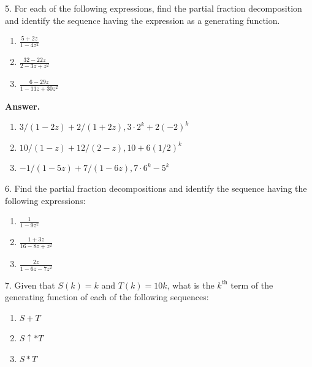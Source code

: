 \documentclass[10pt,]{book}
\theoremstyle{plain}
\theoremstyle{definition}
\theoremstyle{definition}
\theoremstyle{definition}
\theoremstyle{definition}
\numberwithin{equation}{section}
\begin{document}
\begin{exercisegroup}
\item[5.]\hypertarget{exercise-41}{}For each of the following expressions, find the partial fraction decomposition and identify the sequence having the expression as a generating
function.%
\par
\leavevmode%
\begin{enumerate}[label=\alph*]
\item\hypertarget{li-184}{} \(\frac{5+2z}{1-4z^2}\)%
\item\hypertarget{li-185}{} \(\frac{32-22z}{2-3z+z^2}\)%
\item\hypertarget{li-186}{} \(\frac{6-29z}{1-11z+ 30z^2}\)%
\end{enumerate}
%
\par\smallskip
\par\smallskip
\noindent\textbf{Answer.}\hypertarget{answer-21}{}\quad
\leavevmode%
\begin{enumerate}[label=\alph*]
\item\hypertarget{li-187}{} \(3/(1-2z)+2/(1+2z), 3\cdot 2^k+2(-2)^k\)%
\item\hypertarget{li-188}{} \(10/(1-z)+12/(2-z), 10+6(1/2)^k\)%
\item\hypertarget{li-189}{} \(-1/(1-5z)+7/(1-6z), 7\cdot 6^k-5^k\)%
\end{enumerate}
%
\item[6.]\hypertarget{exercise-42}{}Find the partial fraction decompositions and identify the sequence having the following expressions:%
\par
\leavevmode%
\begin{enumerate}[label=\alph*]
\item\hypertarget{li-190}{} \(\frac{1}{1-9z^2}\)%
\item\hypertarget{li-191}{} \(\frac{1+3z}{16-8z+z^2}\)%
\item\hypertarget{li-192}{} \(\frac{2z}{1-6z-7z^2}\)%
\end{enumerate}
%
\par\smallskip
\item[7.]\hypertarget{exercise-43}{} Given that \(S(k) = k\) and \(T(k) = 10k\), what is the \(k^{\text{th}}\) term of the generating function of each of the following sequences:%
\par
\leavevmode%
\begin{enumerate}[label=\alph*]
\item\hypertarget{li-193}{}\(S + T\)%
\item\hypertarget{li-194}{}\(S\uparrow  * T\) %
\item\hypertarget{li-195}{} \(S * T\)%

\end{enumerate}
\end{exercisegroup}
\end{document}
